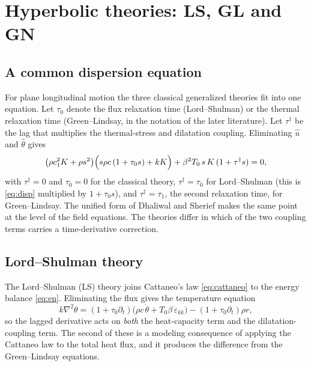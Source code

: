 \section{Hyperbolic theories: LS, GL and GN}\label{sec:hyperbolic}
\subsection{A common dispersion equation}
For plane longitudinal motion the three classical generalized theories fit into one equation. Let $\tau_0$ denote the flux relaxation time (Lord--Shulman) or the thermal relaxation time (Green--Lindsay, in the notation of the later literature). Let $\tau^\dagger$ be the lag that multiplies the thermal-stress and dilatation coupling. Eliminating $\hat u$ and $\hat\theta$ gives
\begin{equation}
\bigl(\rho c_1^2K+\rho s^2\bigr)\Bigl(s\rho c\,(1+\tau_0s)+kK\Bigr)+\beta^2T_0\,s\,K\,(1+\tau^\dagger s)=0,\label{eq:unified}
\end{equation}
with $\tau^\dagger=0$ and $\tau_0=0$ for the classical theory, $\tau^\dagger=\tau_0$ for Lord--Shulman (this is \eqref{eq:disp} multiplied by $1+\tau_0s$), and $\tau^\dagger=\tau_1$, the second relaxation time, for Green--Lindsay. The unified form of Dhaliwal and Sherief \citep{Dhaliwal1980} makes the same point at the level of the field equations. The theories differ in which of the two coupling terms carries a time-derivative correction.

\subsection{Lord--Shulman theory}\label{sec:ls}
The Lord--Shulman (LS) theory joins Cattaneo's law \eqref{eq:cattaneo} to the energy balance \eqref{eq:en}. Eliminating the flux gives the temperature equation
\begin{equation}
k\nabla^2\theta=(1+\tau_0\partial_t)\bigl(\rho c\,\dot\theta+T_0\beta\,\dot\varepsilon_{kk}\bigr)-(1+\tau_0\partial_t)\rho r, \label{eq:LS}
\end{equation}
so the lagged derivative acts on \emph{both} the heat-capacity term and the dilatation-coupling term. The second of these is a modeling consequence of applying the Cattaneo law to the total heat flux, and it produces the difference from the Green--Lindsay equations.

